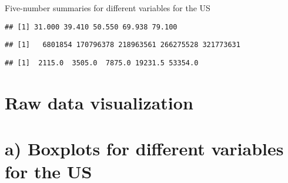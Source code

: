 \documentclass[]{article}
\newenvironment{Shaded}{\begin{snugshade}}{\end{snugshade}}
\newcommand{\KeywordTok}[1]{\textcolor[rgb]{0.13,0.29,0.53}{\textbf{#1}}}
\newcommand{\DataTypeTok}[1]{\textcolor[rgb]{0.13,0.29,0.53}{#1}}
\newcommand{\DecValTok}[1]{\textcolor[rgb]{0.00,0.00,0.81}{#1}}
\newcommand{\StringTok}[1]{\textcolor[rgb]{0.31,0.60,0.02}{#1}}
\newcommand{\OperatorTok}[1]{\textcolor[rgb]{0.81,0.36,0.00}{\textbf{#1}}}
\newcommand{\NormalTok}[1]{#1}
\begin{document}
Five-number summaries for different variables for the US

\begin{Shaded}
\end{Shaded}

\begin{verbatim}
## [1] 31.000 39.410 50.550 69.938 79.100
\end{verbatim}

\begin{Shaded}
\end{Shaded}

\begin{verbatim}
## [1]   6801854 170796378 218963561 266275528 321773631
\end{verbatim}

\begin{Shaded}
\end{Shaded}

\begin{verbatim}
## [1]  2115.0  3505.0  7875.0 19231.5 53354.0
\end{verbatim}

\section{Raw data visualization}\label{raw-data-visualization-1}

\section{a) Boxplots for different variables for the
US}\label{a-boxplots-for-different-variables-for-the-us}

\begin{Shaded}
\end{Shaded}
\end{document}
